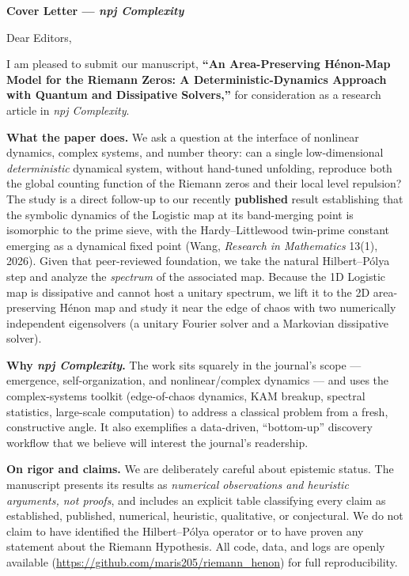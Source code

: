 \documentclass[11pt]{article}
\begin{document}
\noindent\textbf{\large Cover Letter --- \textit{npj Complexity}}

\vspace{1em}

\noindent Dear Editors,

\vspace{0.6em}

I am pleased to submit our manuscript, \textbf{``An Area-Preserving H\'enon-Map Model for the Riemann Zeros: A Deterministic-Dynamics Approach with Quantum and Dissipative Solvers,''} for consideration as a research article in \textit{npj Complexity}.

\vspace{0.4em}

\noindent\textbf{What the paper does.} We ask a question at the interface of nonlinear dynamics, complex systems, and number theory: can a single low-dimensional \emph{deterministic} dynamical system, without hand-tuned unfolding, reproduce both the global counting function of the Riemann zeros and their local level repulsion? The study is a direct follow-up to our recently \textbf{published} result establishing that the symbolic dynamics of the Logistic map at its band-merging point is isomorphic to the prime sieve, with the Hardy--Littlewood twin-prime constant emerging as a dynamical fixed point (Wang, \textit{Research in Mathematics} 13(1), 2026). Given that peer-reviewed foundation, we take the natural Hilbert--P\'olya step and analyze the \emph{spectrum} of the associated map. Because the 1D Logistic map is dissipative and cannot host a unitary spectrum, we lift it to the 2D area-preserving H\'enon map and study it near the edge of chaos with two numerically independent eigensolvers (a unitary Fourier solver and a Markovian dissipative solver).

\vspace{0.4em}

\noindent\textbf{Why \textit{npj Complexity}.} The work sits squarely in the journal's scope --- emergence, self-organization, and nonlinear/complex dynamics --- and uses the complex-systems toolkit (edge-of-chaos dynamics, KAM breakup, spectral statistics, large-scale computation) to address a classical problem from a fresh, constructive angle. It also exemplifies a data-driven, ``bottom-up'' discovery workflow that we believe will interest the journal's readership.

\vspace{0.4em}

\noindent\textbf{On rigor and claims.} We are deliberately careful about epistemic status. The manuscript presents its results as \emph{numerical observations and heuristic arguments, not proofs}, and includes an explicit table classifying every claim as established, published, numerical, heuristic, qualitative, or conjectural. We do not claim to have identified the Hilbert--P\'olya operator or to have proven any statement about the Riemann Hypothesis. All code, data, and logs are openly available (\url{https://github.com/maris205/riemann_henon}) for full reproducibility.
\end{document}
